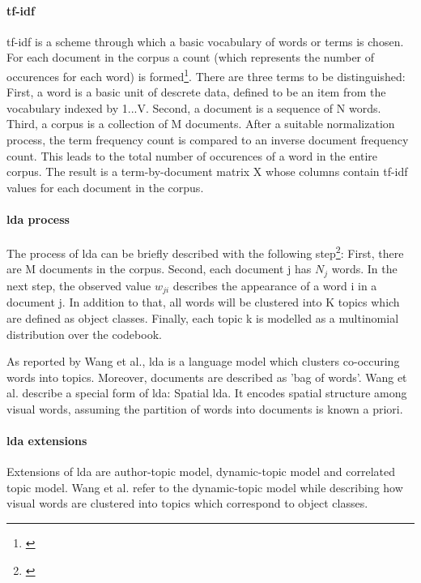\paragraph{\gls{tf-idf}}

\gls{tf-idf} is a scheme through which a basic vocabulary of words or terms is chosen. For each document in the corpus a count (which represents the number of occurences for each word) is formed\footnote{\autocite{blei_2003}}. 
There are three terms to be distinguished: First, a word is a basic unit of descrete data, defined to be an item from the vocabulary indexed by {1...V}. Second, a document is a sequence of N words. Third, a corpus is a collection of M documents.
After a suitable normalization process, the term frequency count is compared to an inverse document frequency count. This leads to the total number of occurences of a word in the entire corpus.
The result is a term-by-document matrix X whose columns contain \gls{tf-idf} values for each document in the corpus. 

\paragraph{\gls{lda} process}

The process of \gls{lda} can be briefly described with the following step\footnote{\autocite{wang_2008}}: First, there are M documents in the corpus. Second, each document j has \(N_{j}\) words. In the next step, the observed value \(w_{ji}\) describes the appearance of a word i in a document j. In addition to that, all words will be clustered into K topics which are defined as object classes. Finally, each topic k is modelled as a multinomial distribution over the codebook.

As reported by Wang et al., \gls{lda} is a language model which clusters co-occuring words into topics. Moreover, documents are described as 'bag of words'. 
Wang et al. describe a special form of \gls{lda}: Spatial \gls{lda}. It encodes spatial structure among visual words, assuming the partition of words into documents is known a priori. 

\paragraph{\gls{lda} extensions}

Extensions of \gls{lda} are author-topic model, dynamic-topic model and correlated topic model. Wang et al. refer to the dynamic-topic model while describing how visual words are clustered into topics which correspond to object classes.
 
